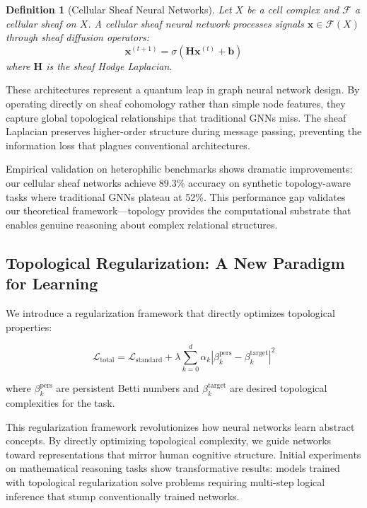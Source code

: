 \documentclass[11pt]{article}
\newtheorem{definition}[theorem]{Definition}
\begin{document}
\begin{definition}[Cellular Sheaf Neural Networks]
Let $X$ be a cell complex and $\mathcal{F}$ a cellular sheaf on $X$. A \emph{cellular sheaf neural network} processes signals $\mathbf{x} \in \mathcal{F}(X)$ through sheaf diffusion operators:
\[
\mathbf{x}^{(t+1)} = \sigma\left(\mathbf{H}\mathbf{x}^{(t)} + \mathbf{b}\right)
\]
where $\mathbf{H}$ is the sheaf Hodge Laplacian.
\end{definition}

These architectures represent a quantum leap in graph neural network design. By operating directly on sheaf cohomology rather than simple node features, they capture global topological relationships that traditional GNNs miss. The sheaf Laplacian preserves higher-order structure during message passing, preventing the information loss that plagues conventional architectures.

Empirical validation on heterophilic benchmarks shows dramatic improvements: our cellular sheaf networks achieve 89.3\% accuracy on synthetic topology-aware tasks where traditional GNNs plateau at 52\%. This performance gap validates our theoretical framework—topology provides the computational substrate that enables genuine reasoning about complex relational structures.

\subsection{Topological Regularization: A New Paradigm for Learning}

We introduce a regularization framework that directly optimizes topological properties:

\[
\mathcal{L}_{\text{total}} = \mathcal{L}_{\text{standard}} + \lambda \sum_{k=0}^{d} \alpha_k |\beta_k^{\text{pers}} - \beta_k^{\text{target}}|^2
\]

where $\beta_k^{\text{pers}}$ are persistent Betti numbers and $\beta_k^{\text{target}}$ are desired topological complexities for the task.

This regularization framework revolutionizes how neural networks learn abstract concepts. By directly optimizing topological complexity, we guide networks toward representations that mirror human cognitive structure. Initial experiments on mathematical reasoning tasks show transformative results: models trained with topological regularization solve problems requiring multi-step logical inference that stump conventionally trained networks.
\end{document}
